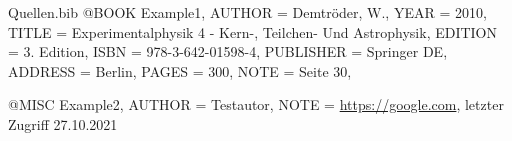 \newpage
{}
\renewcommand{\refname}{Quellen}   
\renewcommand{\bibname}{Quellen} %




\begin{filecontents}{Quellen.bib}
@BOOK
{
    Example1,
	AUTHOR = {Demtröder, W.},
	YEAR = {2010},
	TITLE = {Experimentalphysik 4 - Kern-, Teilchen- Und Astrophysik},
	EDITION = {3. Edition},
	ISBN = {978-3-642-01598-4},
	PUBLISHER = {Springer DE},
	ADDRESS = {Berlin},
	PAGES = {300},
    NOTE = {Seite 30},
}

@MISC
{
    Example2,
	AUTHOR = {Testautor},
    NOTE = {\url{https://google.com}, letzter Zugriff 27.10.2021}
}
\end{filecontents}